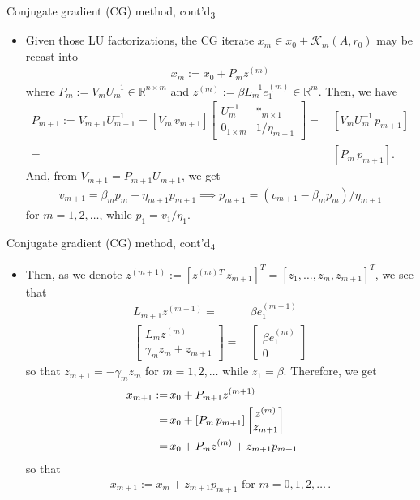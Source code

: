 \documentclass[t,usepdftitle=false]{beamer}
\begin{document}
\begin{frame}{Conjugate gradient (CG) method, cont'd\textsubscript{3}}
\begin{itemize}
\item[] Given those LU factorizations, the CG iterate $x_m\in x_0+\mathcal{K}_m(A,r_0)$ may be recast into
\begin{align*}
x_m:=x_0+P_mz^{(m)}
\end{align*}
where $P_m:=V_mU_m^{-1}\in\mathbb{R}^{n\times m}$ and $z^{(m)}:=\beta L_m^{-1}e_1^{(m)}\in\mathbb{R}^m$.
Then, we have
\begin{align*}
P_{m+1}:=V_{m+1}U_{m+1}^{-1}=
[V_m\,v_{m+1}]
\begin{bmatrix}
U_m^{-1}&*_{m\times 1}\\
0_{1\times m}&1/\eta_{m+1}
\end{bmatrix}
=&\,[V_mU_m^{-1}\,p_{m+1}]\\
=&\,[P_m\,p_{m+1}].
\end{align*}
And, from $V_{m+1}=P_{m+1}U_{m+1}$, we get
\begin{align*}
v_{m+1}=\beta_mp_m+\eta_{m+1}p_{m+1}
\implies
\boxed{p_{m+1}=(v_{m+1}-\beta_mp_m)/\eta_{m+1}}
\end{align*}
for $m=1,2,\dots$, while $\boxed{p_1=v_1/\eta_1}$.
\end{itemize}
\end{frame}

\begin{frame}{Conjugate gradient (CG) method, cont'd\textsubscript{4}}
\begin{itemize}
\item[] Then, as we denote $z^{(m+1)}:=[z^{(m)}{}^T\,z_{m+1}]^T=[z_1,\dots,z_m,z_{m+1}]^T$, we see that
\begin{align*}
L_{m+1}z^{(m+1)}
=&\,\beta e_1^{(m+1)}\\
\begin{bmatrix}L_mz^{(m)}\\\gamma_mz_m+z_{m+1}\end{bmatrix}
=&\,\begin{bmatrix}\beta e_1^{(m)}\\0\end{bmatrix}
\end{align*}
so that $\boxed{z_{m+1}=-\gamma_mz_m}$ for $m=1,2,\dots$ while $\boxed{z_1=\beta}$.
Therefore, we get\vspace{-.3cm}
\begin{align*}
\hspace{-.5cm}
x_{m+1}:=&\,x_0+P_{m+1}z^{(m+1)}\\
=&\,x_0+[P_m\,p_{m+1}]\begin{bmatrix}z^{(m)}\\z_{m+1}\end{bmatrix}\\
=&\,x_0+P_mz^{(m)}+z_{m+1}p_{m+1}
\end{align*}
so that
\begin{align*}
\boxed{x_{m+1}:=x_m+z_{m+1}p_{m+1}
\text{ for }m=0,1,2,\dots}\,.
\end{align*}
\end{itemize}
\end{frame}
\end{document}
